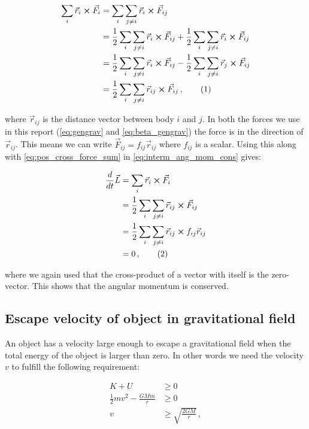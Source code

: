 \documentclass[reprint,english,notitlepage]{revtex4-1}  %
\newcommand\numberthis{\addtocounter{equation}{1}\tag{\theequation}}
\begin{document}
\begin{align*}
\sum\limits_i \vec{r}_i \cross \vec{F}_i &= \sum\limits_i \sum\limits_{j \neq i} \vec{r}_i \cross \vec{F}_{ij} \\
&= \frac{1}{2} \sum\limits_i \sum\limits_{j \neq i} \vec{r}_i \cross \vec{F}_{ij} + \frac{1}{2} \sum\limits_i \sum\limits_{j \neq i} \vec{r}_i \cross \vec{F}_{ij} \\
&= \frac{1}{2} \sum\limits_i \sum\limits_{j \neq i} \vec{r}_i \cross \vec{F}_{ij} - \frac{1}{2} \sum\limits_i \sum\limits_{j \neq i} \vec{r}_j \cross \vec{F}_{ij} \\
&= \frac{1}{2} \sum\limits_i \sum\limits_{j\neq i } \vec{r}_{ij} \cross \vec{F}_{ij} \, , \numberthis \label{eq:pos_cross_force_sum}
\end{align*}

where $\vec{r}_{ij}$ is the distance vector between body $i$ and $j$. In both the forces we use in this report (\eqref{eq:gengrav} and \eqref{eq:beta_gengrav}) the force is in the direction of $\vec{r}_{ij}$. This means we can write $\vec{F}_{ij} = f_{ij} \vec{r}_{ij}$ where $f_{ij}$ is a scalar. Using this along with \eqref{eq:pos_cross_force_sum} in \eqref{eq:interm_ang_mom_cons} gives:

\begin{align*}
\frac{d}{dt} \vec{L} &= \sum\limits_i \vec{r}_i \cross \vec{F}_i \\
&= \frac{1}{2} \sum\limits_i \sum\limits_{j\neq i } \vec{r}_{ij} \cross \vec{F}_{ij} \\
&= \frac{1}{2} \sum\limits_i \sum\limits_{j\neq i } \vec{r}_{ij} \cross f_{ij} \vec{r}_{ij} \\
&= 0 \, , \numberthis \label{eq:ang_mom_cons}
\end{align*}

where we again used that the cross-product of a vector with itself is the zero-vector. This shows that the angular momentum is conserved.

\subsection{Escape velocity of object in gravitational field} \label{sec:II:e}

An object has a velocity large enough to escape a gravitational field when the total energy of the object is larger than zero. In other words we need the velocity $v$ to fulfill the following requirement:

\begin{align*}
K + U &\geq 0 \\
\frac{1}{2}mv^2 - \frac{GMm}{r} &\geq 0 \\
v &\geq \sqrt{\frac{2GM}{r}} \, ,
\end{align*}
\end{document}
